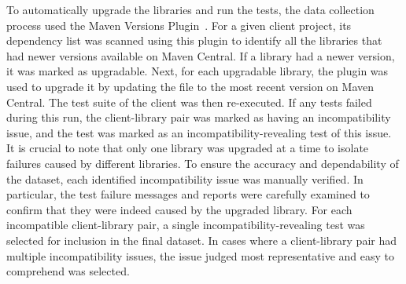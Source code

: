 To automatically upgrade the libraries and run the tests, the data collection process used the Maven Versions Plugin~\cite{mvnplugin}. For a given client project, its dependency list was scanned using this plugin to identify all the
libraries that had newer versions available on Maven Central. If a
library had a newer version, it was marked as upgradable. Next, for
each upgradable library, the plugin was used to upgrade it by updating
the  file to the most recent version on Maven
Central. The test suite of the client was then re-executed. If any
tests failed during this run, the client-library pair was marked as having an incompatibility issue, and the test was marked as an incompatibility-revealing test of this issue. It is crucial to note
that only one library was upgraded at a time to isolate failures caused
by different libraries. To ensure the accuracy and dependability of
the dataset, each identified incompatibility issue was manually verified. In particular, the test failure messages and reports were carefully examined to confirm that they were indeed
caused by the upgraded library. For each incompatible client-library
pair, a single incompatibility-revealing test was selected for inclusion in the final dataset. In cases where a client-library pair
had multiple incompatibility issues, the issue judged most representative and easy to comprehend was selected.



